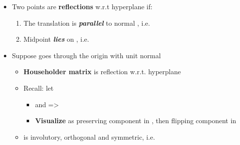 \begin{itemize}

  \item
        Two points  are
        \textbf{reflections} w.r.t hyperplane
         if:

        \begin{enumerate}
          \def\labelenumi{\arabic{enumi})}

          \item
                The translation
                is \textbf{\emph{parallel}} to normal ,
                i.e.~
          \item
                Midpoint 
                \textbf{\emph{lies}} on ,
                i.e.~
        \end{enumerate}
  \item
        Suppose
        goes through the origin with unit normal

        \begin{itemize}

          \item
                \textbf{Householder matrix}
                is reflection w.r.t. hyperplane 
          \item
                Recall: let

                \begin{itemize}

                  \item
                        and
                        =\textgreater{}
                  \item
                        \textbf{Visualize} as preserving component in
                        , then flipping component in
                \end{itemize}
          \item
                 is involutory, orthogonal and
                symmetric,
                i.e.~
        \end{itemize}
\end{itemize}